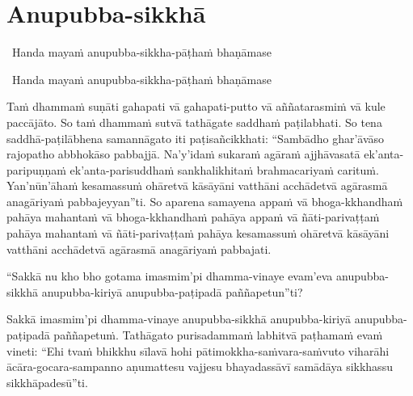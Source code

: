\section{Anupubba-sikkhā}

\ifninebythirteen

\vspace{-0.25mm}

\begin{leader}
  \anglebracketleft\ \hspace{-0.5mm}Handa mayaṁ anupubba-sikkha-pāṭhaṁ bhaṇāmase \hspace{-0.5mm}\anglebracketright\
\end{leader}

\else

\begin{leader}
  \anglebracketleft\ \hspace{-0.5mm}Handa mayaṁ anupubba-sikkha-pāṭhaṁ bhaṇāmase \hspace{-0.5mm}\anglebracketright\
\end{leader}

\fi

Taṁ dhammaṁ suṇāti gahapati vā gahapati-putto vā aññatarasmiṁ vā kule paccājāto. So taṁ dhammaṁ sutvā tathāgate saddhaṁ paṭilabhati. So tena saddhā-paṭilābhena samannāgato iti paṭisañcikkhati: ``Sambādho ghar'āvāso rajopatho abbhokāso pabbajjā. Na'y'idaṁ sukaraṁ agāraṁ ajjhāvasatā ek'anta-paripuṇṇaṁ ek'anta-parisuddhaṁ sankhalikhitaṁ brahmacariyaṁ carituṁ. Yan'nūn'āhaṁ kesamassuṁ ohāretvā kāsāyāni vatthāni acchādetvā agārasmā anagāriyaṁ pabbajeyyan''ti. So aparena samayena appaṁ vā bhoga-kkhandhaṁ pahāya mahantaṁ vā bhoga-kkhandhaṁ pahāya appaṁ vā ñāti-parivaṭṭaṁ pahāya mahantaṁ vā ñāti-parivaṭṭaṁ pahāya kesamassuṁ ohāretvā kāsāyāni vatthāni acchādetvā agārasmā anagāriyaṁ pabbajati.

\suttaRef{[MN 27 / 38 / 51]}

``Sakkā nu kho bho gotama imasmim'pi dhamma-vinaye evam'eva anupubba-sikkhā anupubba-kiriyā anupubba-paṭipadā paññapetun''ti?

Sakkā imasmim'pi dhamma-vinaye anupubba-sikkhā anupubba-kiriyā anupubba-paṭipadā paññapetuṁ. Tathāgato purisadammaṁ labhitvā paṭhamaṁ evaṁ vineti: ``Ehi tvaṁ bhikkhu sīlavā hohi pātimokkha-saṁvara-saṁvuto viharāhi ācāra-gocara-sampanno aṇumattesu vajjesu bhayadassāvī samādāya sikkhassu sikkhāpadesū''ti.

\suttaRef{[MN 107]}

\ifafive\clearpage\fi


